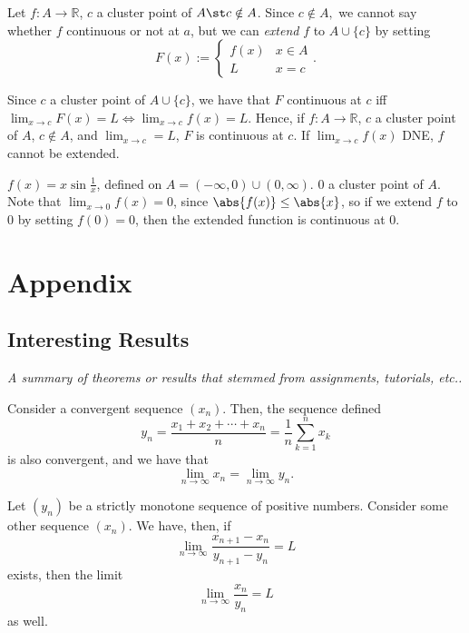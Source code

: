 \documentclass[12pt]{article}
\begin{document}
\begin{definition}
  Let $f: A \to \mathbb{R}$, $c$ a cluster point of $A \st c \notin A$. Since $c \notin A,$ we cannot say whether $f$ continuous or not at $a$, but we can \emph{extend} $f$ to $A \cup \{c\}$ by setting \[F(x) := \begin{cases}
    f(x) & x \in A \\
    L & x = c
  \end{cases}.\]
\end{definition}

\begin{remark}
  Since $c$ a cluster point of $A \cup \{c\}$, we have that $F$ continuous at $c$ iff $\lim_{x\to c}F(x) = L \iff \lim_{x\to c} f(x) = L$. Hence, if $f : A \to \mathbb{R}$, $c$ a cluster point of $A$, $c \notin A$, and $\lim_{x \to c} = L$, $F$ is continuous at $c$. If $\lim_{x\to c} f(x)$ DNE, $f$ cannot be extended.
\end{remark}

\begin{example}
  $f(x) = x \sin \frac{1}{x}$, defined on $A = (-\infty, 0)\cup(0,\infty)$. $0$ a cluster point of $A$. Note that $\lim_{x\to 0} f(x) = 0$, since $\abs{f(x)} \leq \abs{x}$, so if we extend $f$ to $0$ by setting $f(0) = 0$, then the extended function is continuous at $0$.
\end{example}

\newpage
\section{Appendix}
\subsection{Interesting Results}
\textit{A summary of theorems or results that stemmed from assignments, tutorials, etc..}

\begin{theorem}
  Consider a convergent sequence $(x_n)$. Then, the sequence defined \[y_n = \frac{x_1 + x_2 + \cdots +x_n}{n} = \frac{1}{n} \sum_{k=1}^{n} x_k\] is also convergent, and we have that \[\lim_{n\to\infty} x_n = \lim_{n\to\infty} y_n.\]
\end{theorem}
\begin{theorem}
  Let $(y_n)$ be a strictly monotone sequence of positive numbers. Consider some other sequence $(x_n)$. We have, then, if \[\lim_{n\to\infty} \frac{x_{n+1}-x_n}{y_{n+1}-y_n} = L\] exists, then the limit \[\lim_{n\to\infty} \frac{x_n}{y_n} = L\] as well.
\end{theorem}
\end{document}
